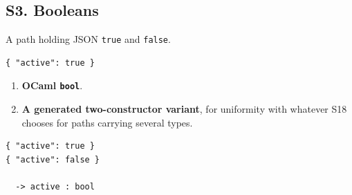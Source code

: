 \subsection*{S3. Booleans}

A path holding JSON \texttt{true} and \texttt{false}.

\begin{lstlisting}[style=json]
{ "active": true }
\end{lstlisting}

\options
\begin{enumerate}[label=\textbf{(\alph*)}]
  \item \textbf{OCaml \texttt{bool}}. \selected
  \item \textbf{A generated two-constructor variant}, for uniformity with
        whatever S18 chooses for paths carrying several types.
\end{enumerate}


\begin{lstlisting}[style=json]
{ "active": true }
{ "active": false }

  -> active : bool
\end{lstlisting}

